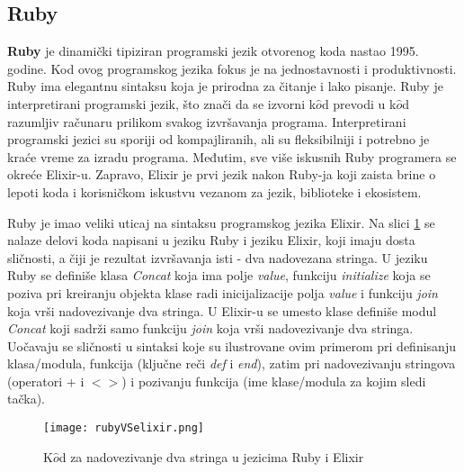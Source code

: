 \documentclass[12pt,oneside]{memoir}
\begin{document}
\subsection{Ruby}
\textbf{Ruby} je dinamički tipiziran programski jezik otvorenog koda nastao 1995. godine. Kod ovog programskog jezika fokus je na jednostavnosti i produktivnosti. Ruby ima elegantnu sintaksu koja je prirodna za čitanje i lako pisanje.
Ruby je interpretirani programski jezik, što znači da se izvorni k$\hat{o}$d prevodi u k$\hat{o}$d razumljiv računaru prilikom svakog izvršavanja programa. Interpretirani programski jezici su sporiji od kompajliranih, ali su fleksibilniji i potrebno je kraće vreme za izradu programa.
Međutim, sve više iskusnih Ruby programera se okreće Elixir-u. Zapravo, Elixir je prvi jezik nakon Ruby-ja koji zaista brine o lepoti koda i korisničkom iskustvu vezanom za jezik, biblioteke i ekosistem. 

Ruby je imao veliki uticaj na sintaksu programskog jezika Elixir. Na slici \ref{fig:RubyElixirCode} se nalaze delovi koda napisani u jeziku Ruby i jeziku Elixir, koji imaju dosta sličnosti, a čiji je rezultat izvršavanja isti - dva nadovezana stringa. U jeziku Ruby se definiše klasa \textit{Concat} koja ima polje \textit{value}, funkciju \textit{initialize} koja se poziva pri kreiranju objekta klase radi inicijalizacije polja \textit{value} i funkciju \textit{join} koja vrši nadovezivanje dva stringa. U Elixir-u se umesto klase definiše modul \textit{Concat} koji sadrži samo funkciju \textit{join} koja vrši nadovezivanje dva stringa. Uočavaju se sličnosti u sintaksi koje su ilustrovane ovim primerom pri definisanju klasa/modula, funkcija (ključne reči \textit{def} i \textit{end}), zatim pri nadovezivanju stringova (operatori $+$ i $<>$) i pozivanju funkcija (ime klase/modula za kojim sledi tačka).

\begin{figure}[!ht]
  \centering
  \texttt{[image: rubyVSelixir.png]}
  \caption{K$\hat{o}$d za nadovezivanje dva stringa u jezicima Ruby i Elixir}
  \label{fig:RubyElixirCode}
\end{figure}
\end{document}
